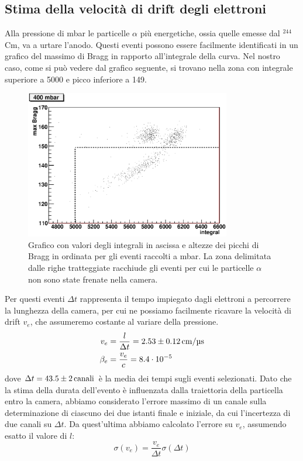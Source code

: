\documentclass[italian,a4paper]{article}
\renewcommand{\a}{\alpha}
\newcommand{\s}{\sigma}
\newcommand{\D}{\Delta}
\newcommand{\Cm}{$^{244}$Cm}
\begin{document}
\subsection{Stima della velocit\`a di drift degli elettroni}
Alla pressione di \unit[400]{mbar} le particelle $\a$ pi\`u energetiche, ossia quelle emesse dal \Cm, va a urtare l'anodo. Questi eventi possono essere facilmente identificati in un grafico del massimo di Bragg in rapporto all'integrale della curva. Nel nostro caso, come si pu\`o vedere dal grafico seguente, si trovano nella zona con integrale superiore a 5000 e picco inferiore a 149.
\begin{figure}[h!]\centering
\includegraphics[width=0.8\textwidth]{400_max_integ.eps}
\caption{Grafico con valori degli integrali in ascissa e altezze dei picchi di Bragg in ordinata per gli eventi raccolti a \unit[400]{mbar}. La zona delimitata dalle righe tratteggiate racchiude gli eventi per cui le particelle $\a$ non sono state frenate nella camera.}
\label{max_integ}
\end{figure}
\newpage
Per questi eventi $\D t$ rappresenta il tempo impiegato dagli elettroni a percorrere la lunghezza della camera, per cui ne possiamo facilmente ricavare la velocit\`a di drift $v_e$, che assumeremo costante al variare della pressione.
\begin{align*}
v_e &= \frac{l}{\D t} = \unit[2.53 \pm 0.12]{cm/\micro s}\\
\beta_e &= \frac{v_e}{c} = 8.4 \cdot 10^{-5}
\end{align*}
dove $\D t = \unit[43.5 \pm 2]{canali}$ \`e la media dei tempi sugli eventi selezionati. Dato che la stima della durata dell'evento \`e influenzata dalla traiettoria della particella entro la camera, abbiamo considerato l'errore massimo di un canale sulla determinazione di ciascuno dei due istanti finale e iniziale, da cui l'incertezza di due canali su $\D t$. Da quest'ultima abbiamo calcolato l'errore su $v_e$, assumendo esatto il valore di $l$:
\begin{equation*}
\s(v_e) = \frac{v_e}{\D t} \s(\D t)
\end{equation*}
\end{document}

